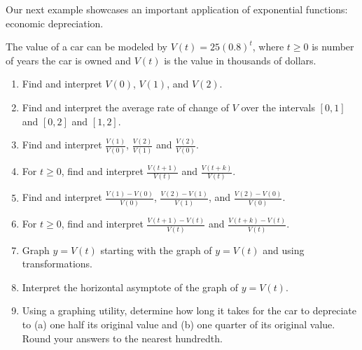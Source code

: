 \documentclass{ximera}
\begin{document}
Our next example showcases an important application of exponential functions:  economic depreciation.



\begin{example}\label{cardepreciationex} The value of a car can be modeled by $V(t) = 25(0.8)^{t}$, where $t \geq 0$ is number of years the car is owned and $V(t)$ is the value in thousands of dollars. 

\begin{enumerate}

\item  Find and interpret $V(0)$, $V(1)$, and $V(2)$.

\item  \label{cararcex} Find and interpret the average rate of change of $V$ over the intervals $[0,1]$ and $[0,2]$ and $[1,2]$.

\item  \label{georatio1} Find and interpret $\frac{V(1)}{V(0)}$, $\frac{V(2)}{V(1)}$ and $\frac{V(2)}{V(0)}$.

\item   \label{georatio2} For $t \geq 0$, find and interpret $\frac{V(t+1)}{V(t)}$ and $\frac{V(t+k)}{V(t)}$. 

\item  \label{carrelarcex1} Find and interpret $\frac{V(1) - V(0)}{V(0)}$, $\frac{V(2) - V(1)}{V(1)}$, and $\frac{V(2) - V(0)}{V(0)}$.

\item \label{carrelarcex2}  For $t \geq 0$, find and interpret $\frac{V(t+1) - V(t)}{V(t)}$ and $\frac{V(t+k) - V(t)}{V(t)}$. 

\item  Graph $y=V(t)$ starting with the graph of $y = V(t)$ and using transformations.

\item   Interpret the horizontal asymptote of the graph of $y = V(t)$.

\item  Using a graphing utility, determine how long it takes for the car to depreciate to (a) one half its original value and (b) one quarter of its original value.  Round your answers to the nearest hundredth.

\end{enumerate}

\begin{explanation}

\begin{enumerate}


\end{enumerate}
\end{explanation}
\end{example}
\end{document}
